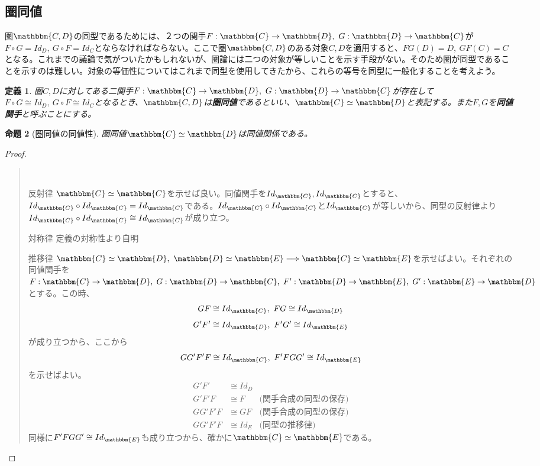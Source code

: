 \documentclass[uplatex,dvipdfmx]{jsarticle}
\newcommand{\cat}[1]{\mathbbm{#1}}
\newcommand{\arrow}{\rightarrow}
\newcommand{\functor}[3]{#1:\cat{#2}\arrow \cat{#3}}
\newtheorem{proof}{証明}[section]
\newtheorem{prop}[proof]{命題}
\newtheorem{define}[proof]{定義}
\numberwithin{proof}{subsection}
\newenvironment{mydescription}
{\begin{description}
  \setlength{\parskip}{0.5cm}
}
{\end{description}}
\begin{document}
  \subsection{圏同値}
  圏$\cat{C,D}$の同型であるためには、２つの関手$\functor{F}{C}{D},\ \functor{G}{D}{C}$が$F\circ G=Id_D,\ G\circ F=Id_C$とならなければならない。ここで圏$\cat{C,D}$のある対象$C,D$を適用すると、$FG(D)=D,\ GF(C)=C$となる。これまでの議論で気がついたかもしれないが、圏論には二つの対象が等しいことを示す手段がない。そのため圏が同型であることを示すのは難しい。対象の等価性についてはこれまで同型を使用してきたから、これらの等号を同型に一般化することを考えよう。\\
  \begin{define}
    圏$C,D$に対してある二関手$\functor{F}{C}{D},\ \functor{G}{D}{C}$が存在して$F\circ G\cong Id_D,\ G\circ F\cong Id_C$となるとき、$\cat{C,D}$は\textbf{圏同値}であるといい、$\cat{C}\simeq \cat{D}$と表記する。また$F,G$を\textbf{同値関手}と呼ぶことにする。
  \end{define}
  \begin{prop}[圏同値の同値性]
    圏同値$\cat{C}\simeq \cat{D}$は同値関係である。
  \end{prop}
  \begin{proof}
    \begin{quote}~\\
			\begin{mydescription}
				\item[反射律] $\cat{C}\simeq \cat{C}$を示せば良い。同値関手を$Id_\cat{C},Id_\cat{C}$とすると、$Id_\cat{C}\circ Id_\cat{C}=Id_\cat{C}$である。$Id_\cat{C}\circ Id_\cat{C}$と$Id_\cat{C}$が等しいから、同型の反射律より$Id_\cat{C}\circ Id_\cat{C}\cong Id_\cat{C}$が成り立つ。
				\item[対称律]定義の対称性より自明
				\item[推移律]$\cat{C}\simeq \cat{D},\ \cat{D}\simeq\cat{E}\Longrightarrow \cat{C}\simeq\cat{E}$を示せばよい。それぞれの同値関手を$\functor{F}{C}{D},\ \functor{G}{D}{C},\ \functor{F'}{D}{E},\ \functor{G'}{E}{D}$とする。この時、
				\[GF\cong Id_\cat{C},\ FG\cong Id_\cat{D}\]
        \[G'F'\cong Id_\cat{D},\ F'G'\cong Id_\cat{E}\]が成り立つから、ここから\[GG'F'F\cong Id_\cat{C},\ F'FGG'\cong Id_\cat{E}\]を示せばよい。\\
        \begin{align*}
          G'F'&\cong Id_D\\
          G'F'F&\cong F&\text{(関手合成の同型の保存)}\\
          GG'F'F&\cong GF&\text{(関手合成の同型の保存)}\\
          GG'F'F&\cong Id_E&\text{(同型の推移律)}
        \end{align*}
        同様に$F'FGG'\cong Id_\cat{E}$も成り立つから、確かに$\cat{C}\simeq\cat{E}$である。
      \end{mydescription}
    \end{quote}
  \end{proof}
\end{document}
